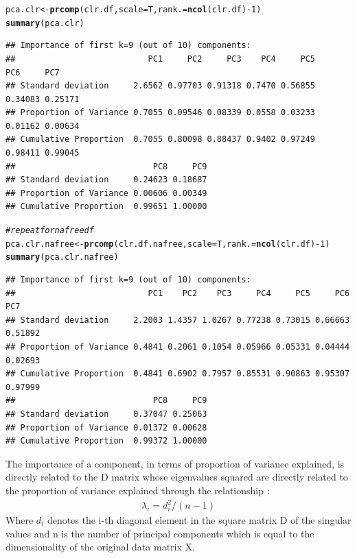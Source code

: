\documentclass[a4paper,oneside,12pt,titlepage]{article}\usepackage[]{graphicx}\usepackage[]{color}
\makeatletter
\newcommand{\hlnum}[1]{\textcolor[rgb]{0.686,0.059,0.569}{#1}}%
\newcommand{\hlcom}[1]{\textcolor[rgb]{0.678,0.584,0.686}{\textit{#1}}}%
\newcommand{\hlopt}[1]{\textcolor[rgb]{0,0,0}{#1}}%
\newcommand{\hlstd}[1]{\textcolor[rgb]{0.345,0.345,0.345}{#1}}%
\newcommand{\hlkwb}[1]{\textcolor[rgb]{0.69,0.353,0.396}{#1}}%
\newcommand{\hlkwc}[1]{\textcolor[rgb]{0.333,0.667,0.333}{#1}}%
\newcommand{\hlkwd}[1]{\textcolor[rgb]{0.737,0.353,0.396}{\textbf{#1}}}%
\newenvironment{kframe}{%
 \def\at@end@of@kframe{}%
 \ifinner\ifhmode%
  \def\at@end@of@kframe{\end{minipage}}%
  \begin{minipage}{\columnwidth}%
 \fi\fi%
 \def\FrameCommand##1{\hskip\@totalleftmargin \hskip-\fboxsep
 \colorbox{shadecolor}{##1}\hskip-\fboxsep
     \hskip-\linewidth \hskip-\@totalleftmargin \hskip\columnwidth}%
 \MakeFramed {\advance\hsize-\width
   \@totalleftmargin\z@ \linewidth\hsize
   \@setminipage}}%
 {\par\unskip\endMakeFramed%
 \at@end@of@kframe}
\newenvironment{knitrout}{}{} %
\makeatother
\begin{document}
\begin{knitrout}
\color{fgcolor}\begin{kframe}
\begin{alltt}
\hlstd{pca.clr} \hlkwb{<-} \hlkwd{prcomp}\hlstd{(clr.df,}\hlkwc{scale} \hlstd{= T,}\hlkwc{rank.} \hlstd{=} \hlkwd{ncol}\hlstd{(clr.df)}\hlopt{-}\hlnum{1} \hlstd{)}
\hlkwd{summary}\hlstd{(pca.clr)}
\end{alltt}
\begin{verbatim}
## Importance of first k=9 (out of 10) components:
##                           PC1     PC2     PC3    PC4     PC5     PC6     PC7
## Standard deviation     2.6562 0.97703 0.91318 0.7470 0.56855 0.34083 0.25171
## Proportion of Variance 0.7055 0.09546 0.08339 0.0558 0.03233 0.01162 0.00634
## Cumulative Proportion  0.7055 0.80098 0.88437 0.9402 0.97249 0.98411 0.99045
##                            PC8     PC9
## Standard deviation     0.24623 0.18687
## Proportion of Variance 0.00606 0.00349
## Cumulative Proportion  0.99651 1.00000
\end{verbatim}
\begin{alltt}
\hlcom{# repeat for nafree df}
\hlstd{pca.clr.nafree} \hlkwb{<-} \hlkwd{prcomp}\hlstd{(clr.df.nafree,}\hlkwc{scale} \hlstd{= T,}\hlkwc{rank.} \hlstd{=} \hlkwd{ncol}\hlstd{(clr.df)}\hlopt{-}\hlnum{1} \hlstd{)}
\hlkwd{summary}\hlstd{(pca.clr.nafree)}
\end{alltt}
\begin{verbatim}
## Importance of first k=9 (out of 10) components:
##                           PC1    PC2    PC3     PC4     PC5     PC6     PC7
## Standard deviation     2.2003 1.4357 1.0267 0.77238 0.73015 0.66663 0.51892
## Proportion of Variance 0.4841 0.2061 0.1054 0.05966 0.05331 0.04444 0.02693
## Cumulative Proportion  0.4841 0.6902 0.7957 0.85531 0.90863 0.95307 0.97999
##                            PC8     PC9
## Standard deviation     0.37047 0.25063
## Proportion of Variance 0.01372 0.00628
## Cumulative Proportion  0.99372 1.00000
\end{verbatim}
\end{kframe}
\end{knitrout}
The importance of a component, in terms of proportion of variance explained, is directly related to the D matrix whose eigenvalues squared are directly related to the proportion of variance explained through the relationship : 
\begin{align} \label{variancepca}
\lambda_i = d_i^2/(n-1)
\end{align}
Where $d_i$ denotes the i-th diagonal element in the square matrix D of the singular values and n is the number of principal components which is equal to the dimensionality of the original data matrix X.
\end{document}

